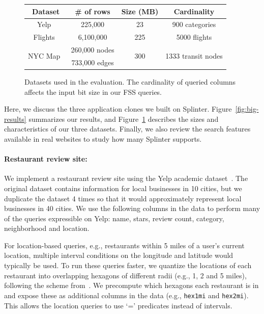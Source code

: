\begin{figure}
	\centering
		\begin{tabular}{cccc}
			\toprule
			\bf Dataset & \bf \# of rows & \bf Size (MB) & \bf Cardinality \\
			\midrule
			Yelp~\cite{yelp-data} & 225,000 & 23 & 900 categories \\
			\midrule
			Flights~\cite{enigma} & 6,100,000 & 225 & 5000 flights \\
			\midrule
			\multirow{2}{*}{NYC Map~\cite{dimacs}} & 260,000 nodes & \multirow{2}{*}{300} & \multirow{2}{*}{1333 transit nodes}\\
			& 733,000 edges & \\
			\bottomrule
		\end{tabular}
	\caption[Datasets used in the evaluation.]{Datasets used in the evaluation. The cardinality of queried columns affects the input bit size in our FSS queries.}
	\label{fig:datasets}
\end{figure}

Here, we discuss the three application clones
we built on Splinter. Figure~\ref{fig:big-results}
summarizes our results, and Figure~\ref{fig:datasets}
describes the sizes and characteristics of our three datasets.
Finally, we also review the search features available in real websites
to study how many Splinter supports.

\paragraph{Restaurant review site:}
We implement a restaurant review site using the Yelp academic dataset~\cite{yelp-data}.
The original dataset contains information for local businesses in 10 cities, 
but we duplicate the dataset 4 times so that it would approximately represent
local businesses in 40 cities.
We use the following columns in the data
to perform many of the queries expressible on Yelp:
name, stars, review count, category, neighborhood and location.

For location-based queries, 
e.g., restaurants within 5 miles of a user's current location, 
multiple interval conditions on the longitude 
and latitude would typically be used. 
To run these queries faster, we quantize the locations of each restaurant into
overlapping hexagons of different radii (e.g., 1, 2 and 5 miles), following
the scheme from~\cite{narayanan2011location}.
We precompute which hexagons each restaurant is in and expose these as
additional columns in the data (e.g., \texttt{hex1mi} and \texttt{hex2mi}).
This allows the location queries to use `=' predicates instead of intervals.


